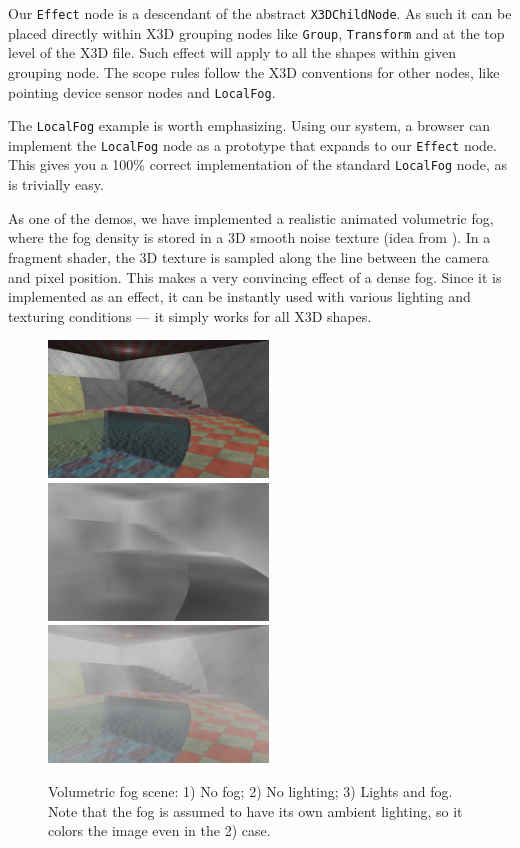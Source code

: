 \documentclass{acmsiggraph}                     %
\begin{document}
Our \texttt{Effect} node is a descendant of the abstract \texttt{X3DChildNode}.
As such it can be placed directly within X3D grouping nodes like
\texttt{Group}, \texttt{Transform} and at the top level of the X3D file.
Such effect will apply to all the shapes within given grouping node.
The scope rules follow the X3D conventions for other nodes,
like pointing device sensor nodes and \texttt{LocalFog}.

The \texttt{LocalFog} example is worth emphasizing. Using our system,
a browser can implement the \texttt{LocalFog} node as a prototype
that expands to our \texttt{Effect} node. This gives you a 100\% correct
implementation of the standard \texttt{LocalFog} node, as is trivially easy.

As one of the demos, we have implemented a realistic
animated volumetric fog, where the fog density is stored in
a 3D smooth noise texture (idea from \cite{humus:volumetricfog}).
In a fragment shader, the 3D texture is sampled
along the line between the camera and pixel position. This makes a very
convincing effect of a dense fog. Since it is implemented as an effect,
it can be instantly used with various lighting and texturing conditions
--- it simply works for all X3D shapes.

\begin{figure}[t]
  \centering
  \includegraphics[width=2.3in]{volumetric_animated_fog_no_fog}
  \includegraphics[width=2.3in]{volumetric_animated_fog_no_light}
  \includegraphics[width=2.3in]{volumetric_animated_fog_all}
  \caption{Volumetric fog scene: 1) No fog; 2) No lighting; 3) Lights and fog.
Note that the fog is assumed to have its own ambient lighting,
so it colors the image even in the 2) case.}
\end{figure}
\end{document}

